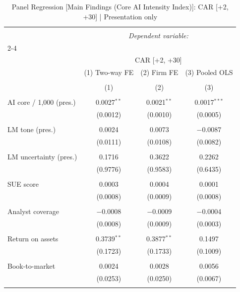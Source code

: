 
\begin{table}[!htbp] \centering 
  \caption{Panel Regression [Main Findings (Core AI Intensity Index)]: CAR [+2, +30]  |  Presentation only} 
  \label{} 
\begin{tabular}{@{\extracolsep{5pt}}lccc} 
\\[-1.8ex]\hline 
\hline \\[-1.8ex] 
 & \multicolumn{3}{c}{\textit{Dependent variable:}} \\ 
\cline{2-4} 
\\[-1.8ex] & \multicolumn{3}{c}{CAR [+2, +30]} \\ 
 & (1) Two-way FE & (2) Firm FE & (3) Pooled OLS \\ 
\\[-1.8ex] & (1) & (2) & (3)\\ 
\hline \\[-1.8ex] 
 AI core / 1,000 (pres.) & 0.0027$^{**}$ & 0.0021$^{**}$ & 0.0017$^{***}$ \\ 
  & (0.0012) & (0.0010) & (0.0005) \\ 
  & & & \\ 
 LM tone (pres.) & 0.0024 & 0.0073 & $-$0.0087 \\ 
  & (0.0111) & (0.0108) & (0.0082) \\ 
  & & & \\ 
 LM uncertainty (pres.) & 0.1716 & 0.3622 & 0.2262 \\ 
  & (0.9776) & (0.9583) & (0.6435) \\ 
  & & & \\ 
 SUE score & 0.0003 & 0.0004 & 0.0001 \\ 
  & (0.0008) & (0.0009) & (0.0008) \\ 
  & & & \\ 
 Analyst coverage & $-$0.0008 & $-$0.0009 & $-$0.0004 \\ 
  & (0.0008) & (0.0009) & (0.0003) \\ 
  & & & \\ 
 Return on assets & 0.3739$^{**}$ & 0.3877$^{**}$ & 0.1497 \\ 
  & (0.1723) & (0.1733) & (0.1009) \\ 
  & & & \\ 
 Book-to-market & 0.0024 & 0.0028 & 0.0056 \\ 
  & (0.0253) & (0.0250) & (0.0067) \\ 
  & & & \\ 

\end{tabular}
\end{table}
